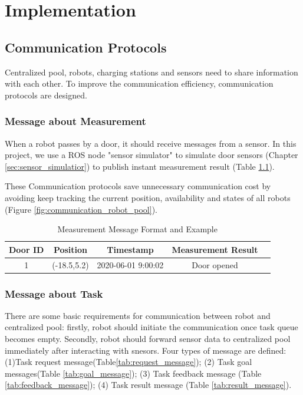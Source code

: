 \chapter{Implementation}


\section{Communication Protocols}
\label{sec:communication_protocols}

Centralized pool, robots, charging stations and sensors need to share information with each other.
To improve the communication efficiency, communication protocols are designed. 

\subsection{Message about Measurement}
\label{sec:measurement_message}
When a robot passes by a door, it should receive messages from a sensor. In this project, we use a ROS node "sensor simulator" to simulate door sensors (Chapter \ref{sec:sensor_simulatior}) to publish instant measurement result (Table \ref{tab:sensor_message}).

These Communication protocols save unnecessary communication cost by avoiding keep tracking the current position, availability and states of all robots (Figure \ref{fig:communication_robot_pool}).

\begin{table}[htb]
\centering
\begin{tabular}{|c|c|c|c|c|} 
\hline
Door ID  & Position& Timestamp & Measurement Result \\
\hline\hline
1&(-18.5,5.2) & 2020-06-01 9:00:02 & Door opened \\ [1ex] 
\hline
\end{tabular}
\caption{Measurement Message Format and Example}
\label{tab:sensor_message}
\end{table}
	

\subsection{Message about Task}
\label{sec:task_message}
There are some basic requirements for communication between robot and centralized pool: firstly, robot should initiate the communication once task queue becomes empty. 
Secondly, robot should forward sensor data to centralized pool immediately after interacting with snesors. 
Four types of message are defined: 
(1)Task request message(Table\ref{tab:request_message}); (2) Task goal messages(Table \ref{tab:goal_message}); (3) Task feedback message (Table \ref{tab:feedback_message}); (4) Task result message (Table \ref{tab:result_message}). 

